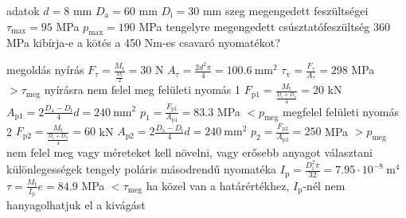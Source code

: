 \parbox{.49\textwidth}{
\begin{outline}
	\1 adatok
		\2 $d = 8$ mm
		\2 $D_\text{a} = 60$ mm
		\2 $D_\text{i} = 30$ mm
		\2 szeg megengedett feszültségei
			\3 $\tau_\text{max} = 95$ MPa
			\3 $p_\text{max} = 190$ MPa
		\2 tengelyre megengedett csúsztatófeszültség $360$ MPa
		\2 kibírja-e a kötés a 450 Nm-es csavaró nyomatékot?
\end{outline}}
\begin{outline}
	\1 megoldás
		\2 nyírás
			\3 $F_\tau = \frac{M_\text{t}}{\frac{D_\text{t}}{2}} = 30$ N
			\3 $A_\tau = \frac{2d^2\pi}{4} = 100.6~\text{mm}^2$
			\3 $\tau_\text{v} = \frac{F_\tau}{A_\tau} = 298$ MPa $ > \tau_\text{meg}$
			\3 nyírásra nem felel meg
		\2 felületi nyomás 1
			\3 $F_\text{p1} = \frac{M_\text{t}}{\frac{D_\text{i}+D_\text{a}}{4}} = 20$ kN
			\3 $A_\text{p1} = 2\frac{D_\text{a}-D_\text{i}}{4}d = 240~\text{mm}^2$
			\3 $p_1 = \frac{F_\text{p1}}{A_\text{p1}} = 83.3$ MPa $ < p_\text{meg}$
			\3 megfelel
		\2 felületi nyomás 2
			\3 $F_\text{p2} = \frac{M_\text{t}}{\frac{D_\text{i}+D_\text{a}}{4}} = 60$ kN
			\3 $A_\text{p2} = 2\frac{D_\text{a}-D_\text{i}}{4}d = 240~\text{mm}^2$
			\3 $p_2 = \frac{F_\text{p2}}{A_\text{p2}} = 250$ MPa $ > p_\text{meg}$
			\3 nem felel meg
		\2 vagy méreteket kell növelni, vagy erősebb anyagot választani
		\2 különlegességek
			\3 tengely poláris másodrendű nyomatéka $I_\text{p} = \frac{D_\text{i}^2\pi}{32} = 7.95\cdot10^{-8}~\text{m}^4$
			\3 $\tau = \frac{M_\text{t}}{I_\text{p}}e = 84.9$ MPa $ < \tau_\text{meg}$
			\3 ha közel van a határértékhez, $I_\text{p}$-nél nem hanyagolhatjuk el a kivágást
\end{outline}

